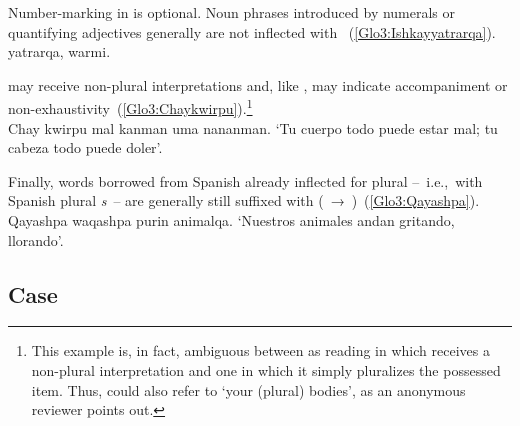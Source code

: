 \noindent
Number-marking in \SYQ{} is optional. Noun phrases introduced by numerals or quantifying adjectives generally are not inflected with ~(\ref{Glo3:Ishkayyatrarqa}).\\

%
{ yatrarqa,  warmi.}%
{}%
{}{}%

\noindent
{} may receive non-plural interpretations and, like , may indicate accompaniment or non-exhaustivity~(\ref{Glo3:Chaykwirpu}).\footnote{This example is, in fact, ambiguous between as reading in which  receives a non-plural interpretation and one in which it simply pluralizes the possessed item. Thus,  could also refer to ‘your (plural) bodies’, as an anonymous reviewer points out.}\\

%
{Chay kwirpu mal kanman uma nananman.}%
{}%
{‘Tu cuerpo todo puede estar mal; tu cabeza todo puede doler’.}%
{}{}%

\noindent
Finally, words borrowed from Spanish already inflected for plural --~i.e.,~with Spanish plural \textit{s}~-- are generally still suffixed with  (~→~)~(\ref{Glo3:Qayashpa}).\\

%
{Qayashpa waqashpa purin animalqa.}%
{}%
{‘Nuestros animales andan gritando, llorando’.}%
{}{}%

\subsection{Case}\label{ssec:case}

